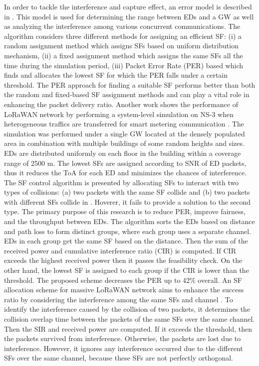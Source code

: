 In order to tackle the interference and capture effect,
	an error model is described in \cite{abeele_scalability_2017}.
This model is used for determining the range between EDs and a GW as well as analyzing the interference among various concurrent communications.
The algorithm considers three different methods for assigning an efficient SF:
	(i) a random assignment method which assigns SFs based on uniform distribution mechanism,
	(ii) a fixed assignment method which assigns the same SFs all the time during the simulation period,
	(iii) Packet Error Rate (PER) based which finds and allocates the lowest SF for which the PER falls under a certain threshold.
The PER approach for finding a suitable SF performs better than both the random and fixed-based SF assignment methods and can play a vital role in enhancing the packet delivery ratio.
Another work shows the performance of LoRaWAN network by performing a system-level simulation on NS-3 when heterogeneous traffics are transferred for smart metering communication \cite{gupta_modelling_2017}.
The simulation was performed under a single GW located at the densely populated area in combination with multiple buildings of some random heights and sizes.
EDs are distributed uniformly on each floor in the building within a coverage range of 2500 m.
The lowest SFs are assigned according to SNR of ED packets,
	thus it reduces the ToA for each ED and minimizes the chances of interference.
The SF control algorithm is presented by allocating SFs to interact with two types of collisions:
	(a) two packets with the same SF collide and (b) two packets with different SFs collide in \cite{reynders_power_2017}.
Hoverer,
	it fails to provide a solution to the second type.
The primary purpose of this research is to reduce PER,
	improve fairness,
	and the throughput between EDs.
The algorithm sorts the EDs based on distance and path loss to form distinct groups,
	where each group uses a separate channel.
EDs in each group get the same SF based on the distance.
Then the sum of the received power and cumulative interference ratio (CIR) is computed.
If CIR exceeds the highest received power then it passes the feasibility check.
On the other hand,
	the lowest SF is assigned to each group if the CIR is lower than the threshold.
The proposed scheme decreases the PER up to 42\% overall.
An SF allocation scheme for massive LoRaWAN network aims to enhance the success ratio by considering the interference among the same SFs and channel \cite{lim_spreading_2018}.
To identify the interference caused by the collision of two packets,
	it determines the collision overlap time between the packets of the same SFs over the same channel.
Then the SIR and received power are computed.
If it exceeds the threshold,
	then the packets survived from interference.
Otherwise,
	the packets are lost due to interference.
However,
	it ignores any interference occurred due to the different SFs over the same channel,
	because these SFs are not perfectly orthogonal.


